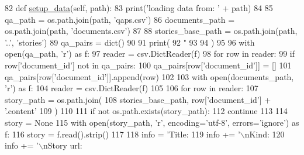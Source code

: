 \begin{DoxyCode}
82     \textcolor{keyword}{def }\hyperlink{namespaceparlai_1_1tasks_1_1multinli_1_1agents_a4fa2cb0ba1ed745336ad8bceed36b841}{setup\_data}(self, path):
83         print(\textcolor{stringliteral}{'loading data from: '} + path)
84 
85         qa\_path = os.path.join(path, \textcolor{stringliteral}{'qaps.csv'})
86         documents\_path = os.path.join(path, \textcolor{stringliteral}{'documents.csv'})
87 
88         stories\_base\_path = os.path.join(path, \textcolor{stringliteral}{'..'}, \textcolor{stringliteral}{'stories'})
89         qa\_pairs = dict()
90 
91         print(
92             \textcolor{stringliteral}{"%
93             %
94         )
95 
96         with open(qa\_path, \textcolor{stringliteral}{'r') as f:}
97 \textcolor{stringliteral}{            reader = csv.DictReader(f)}
98 \textcolor{stringliteral}{            }\textcolor{keywordflow}{for} row \textcolor{keywordflow}{in} reader:
99                 \textcolor{keywordflow}{if} row[\textcolor{stringliteral}{'document\_id'}] \textcolor{keywordflow}{not} \textcolor{keywordflow}{in} qa\_pairs:
100                     qa\_pairs[row[\textcolor{stringliteral}{'document\_id'}]] = []
101                 qa\_pairs[row[\textcolor{stringliteral}{'document\_id'}]].append(row)
102 
103         with open(documents\_path, \textcolor{stringliteral}{'r') as f:}
104 \textcolor{stringliteral}{            reader = csv.DictReader(f)}
105 \textcolor{stringliteral}{}
106 \textcolor{stringliteral}{            }\textcolor{keywordflow}{for} row \textcolor{keywordflow}{in} reader:
107                 story\_path = os.path.join(
108                     stories\_base\_path, row[\textcolor{stringliteral}{'document\_id'}] + \textcolor{stringliteral}{'.content'}
109                 )
110 
111                 \textcolor{keywordflow}{if} \textcolor{keywordflow}{not} os.path.exists(story\_path):
112                     \textcolor{keywordflow}{continue}
113 
114                 story = \textcolor{keywordtype}{None}
115                 with open(story\_path, \textcolor{stringliteral}{'r', encoding='}utf-8', errors='ignore') as f:
116                     story = f.read().strip()
117 
118                 info = \textcolor{stringliteral}{'Title:  %
119                 info += \textcolor{stringliteral}{'\(\backslash\)nKind: %
120                 info += \textcolor{stringliteral}{'\(\backslash\)nStory url: %
}}}}
\end{DoxyCode}
